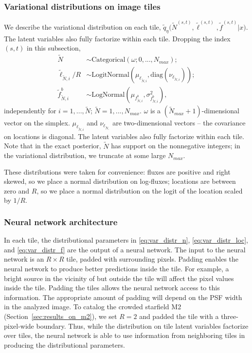 \subsubsection{Variational distributions on image tiles}
We describe the variational distribution on each tile,
$\tilde q_\eta\big(\tilde N^{(s, t)}, \tilde \ell^{(s, t)}, \tilde f^{(s, t)} | x\big)$.
The latent variables also fully factorize within each tile. 
Dropping the index 
$(s,t)$ in this subsection, 
\begin{align}
    \tilde N &\sim \text{Categorical}(
    \omega; 0, ..., N_{max});  \label{eq:var_distr_n}\\
	\tilde \ell_{\tilde N, i} / R &\sim \text{LogitNormal}(\mu_{\ell_{\tilde N, i}}, \text{diag}(\nu_{\ell_{\tilde N, i}}) )\label{eq:var_distr_loc}; \\
	\tilde f^b_{\tilde N, i} &\sim \text{LogNormal}(\mu_{f^b_{\tilde N, i}}, \sigma^2_{f^b_{\tilde N, i}}), \label{eq:var_distr_f}
\end{align}
independently for $i = 1, ..., \tilde N$; $\tilde{N} = 1, ..., N_{max}$. 
$\omega$ is a $(\tilde N_{max} + 1)$-dimensional vector on the simplex. $\mu_{\ell_{\tilde N, i}}$ and $\nu_{\ell_{\tilde N, }}$ are two-dimensional vectors -- the covariance on locations is diagonal. 
The latent variables also fully factorize within each tile. Note that in the exact posterior, $\tilde N$ has support on the nonnegative integers; in the variational distribution, we truncate at some large $N_{max}$. 


These distributions were taken for convenience: fluxes are positive and right skewed, so we place a normal distribution on log-fluxes; locations are between zero and $R$, so 
we place a normal distribution on the logit of the location scaled by $1 / R$. 

\subsubsection{Neural network architecture}
\label{sec:nn_archetecture}

In each tile, the distributional parameters in \eqref{eq:var_distr_n},
\eqref{eq:var_distr_loc}, and \eqref{eq:var_distr_f} are the output of a neural network. 
The input to the neural network is an $R \times R$ tile, padded with surrounding pixels.
Padding enables the neural network to produce better predictions inside the tile. 
For example, a bright source in the vicinity of but outside the tile will affect the pixel values inside the tile. 
Padding the tiles allows the neural network access to this information. 
The appropriate amount of padding will depend on the PSF width in the analyzed image. 
To catalog the crowded starfield M2 (Section~\ref{sec:results_on_m2}),
we set $R = 2$ and padded the tile with a three-pixel-wide boundary.
Thus, while the distribution on tile latent variables factorize over tiles, the neural network is able to use information from neighboring tiles in producing the distributional parameters. 


